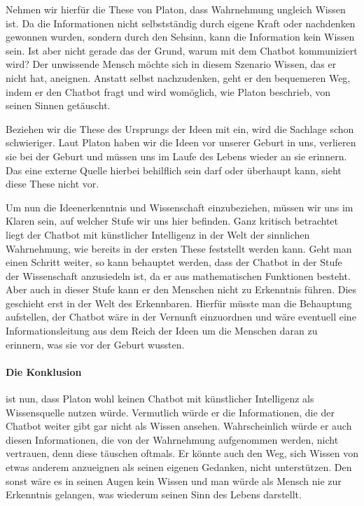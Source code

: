 Nehmen wir hierfür die These von Platon, dass Wahrnehmung ungleich Wissen ist. Da die Informationen nicht selbstständig durch eigene Kraft oder  nachdenken gewonnen wurden, sondern durch den Sehsinn, kann die Information kein Wissen sein. Ist aber nicht gerade das der Grund, warum mit dem Chatbot kommuniziert wird? Der unwissende Mensch möchte sich in diesem Szenario Wissen, das er nicht hat, aneignen. Anstatt selbst nachzudenken, geht er den bequemeren Weg, indem er den Chatbot fragt und wird womöglich, wie Platon beschrieb, von seinen Sinnen getäuscht.

Beziehen wir die These des Ursprungs der Ideen mit ein, wird die Sachlage schon schwieriger. Laut Platon haben wir die Ideen vor unserer Geburt in uns, verlieren sie bei der Geburt und müssen uns im  Laufe des Lebens wieder an sie erinnern. Das eine externe Quelle hierbei behilflich sein darf oder überhaupt kann, sieht diese These nicht vor.

Um nun die Ideenerkenntnis und Wissenschaft einzubeziehen, müssen wir uns im Klaren sein, auf welcher Stufe wir uns hier befinden. Ganz kritisch betrachtet liegt der Chatbot mit künstlicher Intelligenz in der Welt der sinnlichen Wahrnehmung, wie bereits in der ersten These feststellt werden kann. Geht man einen Schritt weiter, so kann behauptet werden, dass der Chatbot in der Stufe der Wissenschaft anzusiedeln ist, da er aus mathematischen Funktionen besteht. Aber auch in dieser Stufe kann er den Menschen nicht zu Erkenntnis führen. Dies geschieht erst in der Welt des Erkennbaren. Hierfür müsste man die Behauptung aufstellen, der Chatbot wäre in der Vernunft einzuordnen und wäre eventuell eine Informationsleitung aus dem Reich der Ideen um die Menschen daran zu erinnern, was sie vor der Geburt wussten.

\paragraph{Die Konklusion} ist nun, dass Platon wohl keinen Chatbot mit künstlicher Intelligenz als Wissensquelle nutzen würde. Vermutlich würde er die Informationen, die der Chatbot  weiter gibt gar nicht als Wissen ansehen. Wahrscheinlich würde er auch diesen Informationen, die von der Wahrnehmung aufgenommen werden, nicht vertrauen, denn diese täuschen oftmals. Er könnte auch den Weg, sich Wissen von etwas anderem anzueignen als seinen eigenen Gedanken, nicht unterstützen. Den sonst wäre es in seinen Augen kein Wissen und man würde als Mensch nie zur Erkenntnis gelangen, was wiederum seinen Sinn des Lebens darstellt.     






